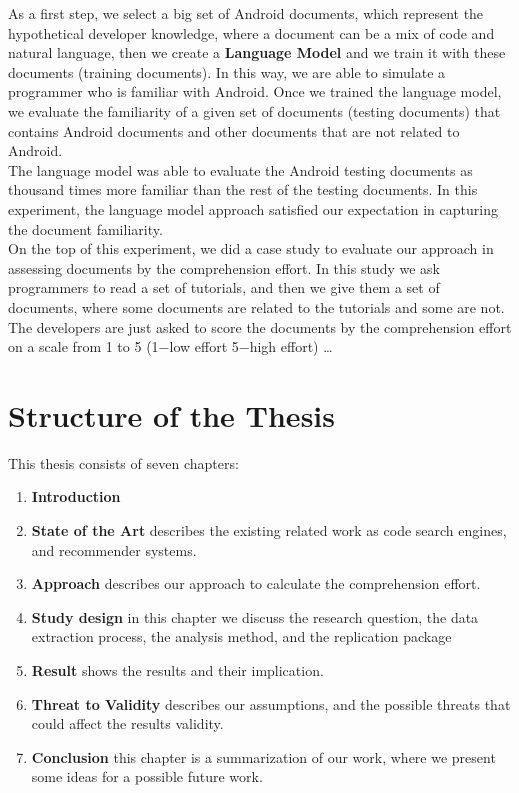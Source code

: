 \documentclass[12pt,mscthesis]{usiinfthesis}
\begin{document}
	 As a first step, we select a big set of Android documents, which represent the hypothetical developer knowledge, where a document can be a mix of code and natural language, then we create a \textbf{ Language Model} and we train it with these documents (training documents). In this way, we are able to simulate a programmer who is familiar with Android. Once we trained the language model, we evaluate the familiarity of a given set of documents (testing documents) that contains Android documents and other documents that are not related to Android.\\ 
	 The language model was able to evaluate the Android testing documents as thousand times more familiar than the rest of the testing documents.
	 In this experiment, the language model approach satisfied our expectation in capturing the document familiarity.\\

	 On the top of this experiment, we did a case study to evaluate our approach in assessing documents by the comprehension effort. In this study we ask programmers to read a set of tutorials, and then we give them a set of documents, where some documents are related to the tutorials and some are not. The developers are just asked to score the documents by the comprehension effort on a scale from 1 to 5 (1$-$low effort 5$-$high effort)
	 \dots 
	 \newpage

	\section{Structure of the Thesis}
	This thesis consists of seven chapters: 
	\begin{enumerate}
	
		\item \textbf{Introduction}
		\item \textbf{State of the Art} describes the existing related work as code search engines, and recommender systems.
		\item \textbf{Approach} describes our approach to calculate the comprehension effort.
		\item \textbf{Study design} in this chapter we discuss the research question, the data extraction process, the analysis method, and the replication package 
		\item \textbf{Result} shows the results and their implication.
		\item \textbf{Threat to Validity} describes our assumptions, and the possible threats that could affect the results validity.
		\item \textbf{Conclusion} this chapter is a summarization of our work, where we present some ideas for a possible future work.
	\end{enumerate}
\end{document}
